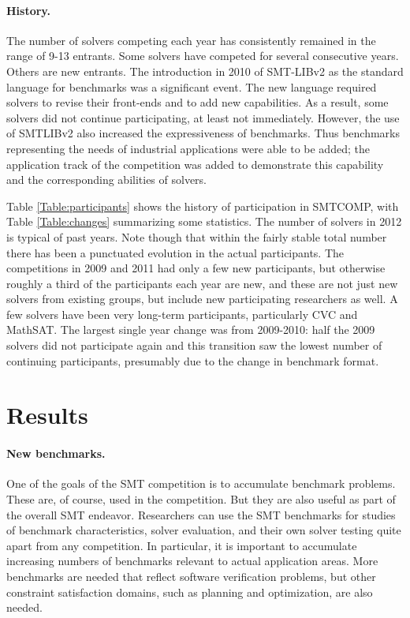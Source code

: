 \documentclass{llncs}
\begin{document}
\paragraph{History.} The number of solvers competing each year has consistently remained in the range of 9-13 entrants.
Some solvers have competed for several consecutive years. Others are new entrants. The introduction in 2010 of SMT-LIBv2 as the standard language for benchmarks was a significant event. The new language required solvers to revise their front-ends and to add new capabilities.
As a result, some solvers did not continue participating, at least not immediately. However, the use of SMTLIBv2 also increased the expressiveness of benchmarks. Thus benchmarks representing the needs of industrial applications were able to be added; 
the application track of the competition was added to demonstrate this capability and the corresponding abilities of solvers.


Table \ref{Table:participants} shows the history of participation in SMTCOMP, with Table \ref{Table:changes} summarizing some statistics. The number of solvers in 2012 is typical of past years. Note though that within the fairly stable total number there has been a punctuated evolution in the actual participants. The competitions in 2009 and 2011 had only a few new participants, but otherwise roughly a third of the participants each year are new, and these are not just new solvers from existing groups, but include new participating researchers as well. A few solvers have been very long-term participants, particularly CVC and MathSAT. The largest single year change was from 2009-2010: half the 2009 solvers did not participate again and this transition saw the lowest number of continuing participants, presumably due to the change in benchmark format.

\section{Results}

\paragraph{New benchmarks.} One of the goals of the SMT competition is to accumulate benchmark problems. These are, of course, used in the competition. But they are also useful as part of the overall SMT endeavor. Researchers can use the SMT benchmarks for studies of benchmark characteristics, solver evaluation, and their own solver testing quite apart from any competition. In particular, it is important to accumulate increasing numbers of benchmarks relevant to actual application areas. More benchmarks are needed that reflect software verification problems, but other constraint satisfaction domains, such as planning and optimization, are also needed.
\end{document}
